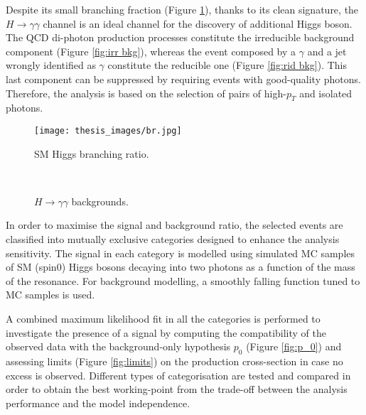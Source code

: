 \documentclass[a4paper, oneside, 11pt, openright]{book}
\begin{document}
 	 	Despite its small branching fraction (Figure \ref{fig: br}), thanks to its clean signature, the $H\to\gamma\gamma$ channel is an ideal channel for the discovery of additional Higgs boson. The QCD di-photon production processes constitute the irreducible background component (Figure \ref{fig:irr bkg}), whereas the event composed by a $\gamma$ and a jet wrongly identified as $\gamma$ constitute the reducible one (Figure \ref{fig:rid bkg}). This last component can be suppressed by requiring events with good-quality photons. Therefore, the analysis is based on the selection of pairs of high-$p_T$ and isolated photons.
 		\begin{figure}
 			\centering
 			\texttt{[image: thesis\_images/br.jpg]}
 			\caption{SM Higgs branching ratio.}
 			\label{fig: br}
 		\end{figure}
	 	\begin{figure}
	 		\centering
	 		\\				
	 		\caption{$H\rightarrow\gamma\gamma$ backgrounds.}
	 		\label{fig:bkgs}
	 	\end{figure}In order to maximise the signal and background ratio, the selected events are classified into mutually exclusive categories designed to enhance the analysis sensitivity. The signal in each category is modelled using simulated MC samples of SM (spin0) Higgs bosons decaying into two photons as a function of the mass of the resonance. For background modelling, a smoothly falling function tuned to MC samples is used.
 		
 		A combined maximum likelihood fit in all the categories is performed to investigate the presence of a signal by computing the compatibility of the observed data with the background-only hypothesis $p_0$ (Figure \ref{fig:p_0}) and assessing limits (Figure \ref{fig:limits}) on the production cross-section in case no excess is observed. Different types of categorisation are tested and compared in order to obtain the best working-point from the trade-off between the analysis performance and the model independence.
 		
\end{document}
